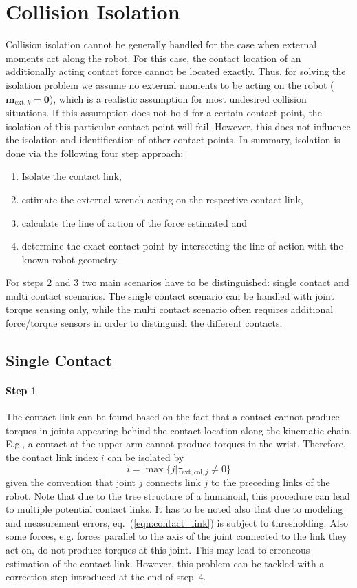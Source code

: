 \section{Collision Isolation}
\label{sec:isolation}
Collision isolation cannot be generally handled for the case when external moments act along the robot. 
For this case, the contact location of an additionally acting contact force cannot be located exactly. 
Thus, for solving the isolation problem we assume no external moments to be acting on the robot ($\bm{m}_{\mathrm{ext},k}=\bm{0}$), which is a realistic assumption for most undesired collision situations.
If this assumption does not hold for a certain contact point, the isolation of this particular contact point will fail.
However, this does not influence the isolation and identification of other contact points.
In summary, isolation is done via the following four step approach:
%
\begin{enumerate}
\item Isolate the contact link,
\item estimate the external wrench acting on the respective contact link,
\item calculate the line of action of the force estimated and
\item determine the exact contact point by intersecting the line of action with the known robot geometry.
\end{enumerate}
%
For steps 2 and 3 two main scenarios have to be distinguished: single contact and multi contact scenarios.
The single contact scenario can be handled with joint torque sensing only, while the multi contact scenario often requires additional force/torque sensors in order to distinguish the different contacts.

\subsection{Single Contact}

\paragraph{Step 1}

The contact link can be found based on the fact that a contact cannot produce torques in joints appearing behind the contact location along the kinematic chain.
E.g., a contact at the upper arm cannot produce torques in the wrist.
Therefore, the contact link index $i$ can be isolated by
%
\begin{equation}
i=\max\{j|\tau_{\mathrm{ext,col},j} \neq 0\}
\label{eqn:contact_link}
\end{equation}
%
given the convention that joint $j$ connects link $j$ to the preceding links of the robot.
Note that due to the tree structure of a humanoid, this procedure can lead to multiple potential contact links. It has to be noted also that due to modeling and measurement errors, eq.~(\ref{eqn:contact_link}) is subject to thresholding.
Also some forces, e.g. forces parallel to the axis of the joint connected to the link they act on, do not produce torques at this joint. This may lead to erroneous estimation of the contact link. However, this problem can be tackled with a correction step introduced at the end of step~4.

